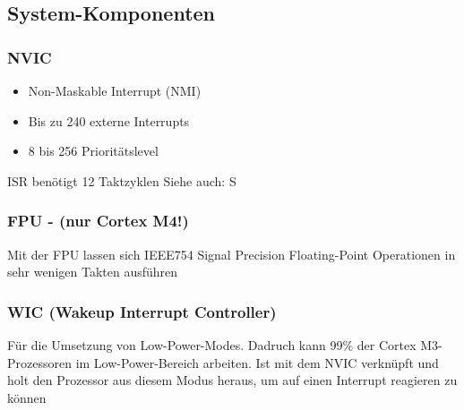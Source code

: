 \subsection{System-Komponenten}
\begin{multicols}{2}
\begin{minipage}{\linewidth}
    \subsubsection{NVIC}
    \begin{itemize}
    \item Non-Maskable Interrupt (NMI)
    \item Bis zu 240 externe Interrupts
    \item 8 bis 256 Prioritätslevel
    \end{itemize}
    \rightarrow ISR benötigt 12 Taktzyklen\newline
    Siehe auch: S\pageref{NVIC}\\
\end{minipage}
\begin{minipage}{\linewidth}
    \subsubsection{FPU - (nur Cortex M4!)}
    Mit der FPU lassen sich IEEE754 Signal Precision Floating-Point Operationen in sehr wenigen Takten ausführen\\
\end{minipage}
\begin{minipage}{\linewidth}
    \subsubsection{WIC (Wakeup Interrupt Controller)}
    Für die Umsetzung von Low-Power-Modes.\newline
    Dadruch kann 99\% der Cortex M3-Prozessoren im Low-Power-Bereich arbeiten.
    \newline
    \newline
    Ist mit dem NVIC verknüpft und holt den Prozessor aus diesem Modus heraus, um auf einen Interrupt reagieren zu können\\
\end{minipage}
\begin{minipage}{\linewidth}

\end{minipage}
\end{multicols}
